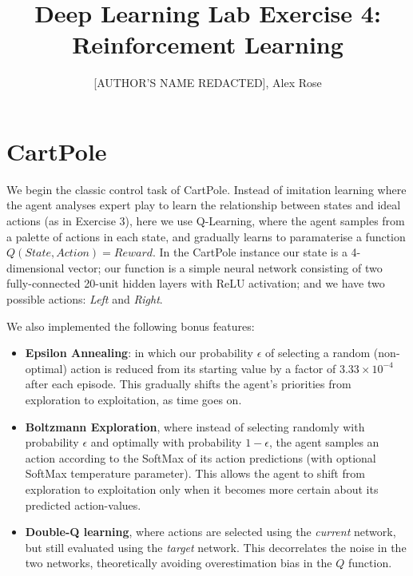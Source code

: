 \documentclass[a4paper, 11pt, conference]{ieeeconf}      %
\title{\LARGE \bf
Deep Learning Lab Exercise 4: Reinforcement Learning}
\author{[AUTHOR'S NAME REDACTED], Alex Rose}
\begin{document}

\maketitle



\section{CartPole}

We begin the classic control task of CartPole. Instead of imitation learning where the agent analyses expert play to learn the relationship between states and ideal actions (as in Exercise 3), here we use Q-Learning, where the agent samples from a palette of actions in each state, and gradually learns to paramaterise a function $Q(State, Action) = Reward$. In the CartPole instance our state is a 4-dimensional vector; our function is a simple neural network consisting of two fully-connected 20-unit hidden layers with ReLU activation; and we have two possible actions: \textit{Left} and \textit{Right}.

We also implemented the following bonus features:

\begin{itemize}
	\item \textbf{Epsilon Annealing}: in which our probability $\epsilon$ of selecting a random (non-optimal) action is reduced from its starting value by a factor of $3.33 \times 10^{-4}$ after each episode. This gradually shifts the agent's priorities from exploration to exploitation, as time goes on.

	\item \textbf{Boltzmann Exploration}, where instead of selecting randomly with probability $\epsilon$ and optimally with probability $1 - \epsilon$, the agent samples an action according to the SoftMax of its action predictions (with optional SoftMax temperature parameter). This allows the agent to shift from exploration to exploitation only when it becomes more certain about its predicted action-values.

	\item \textbf{Double-Q learning}, where actions are selected using the \textit{current} network, but still evaluated using the \textit{target} network. This decorrelates the noise in the two networks, theoretically avoiding overestimation bias in the $Q$ function.

\end{itemize}
\end{document}
